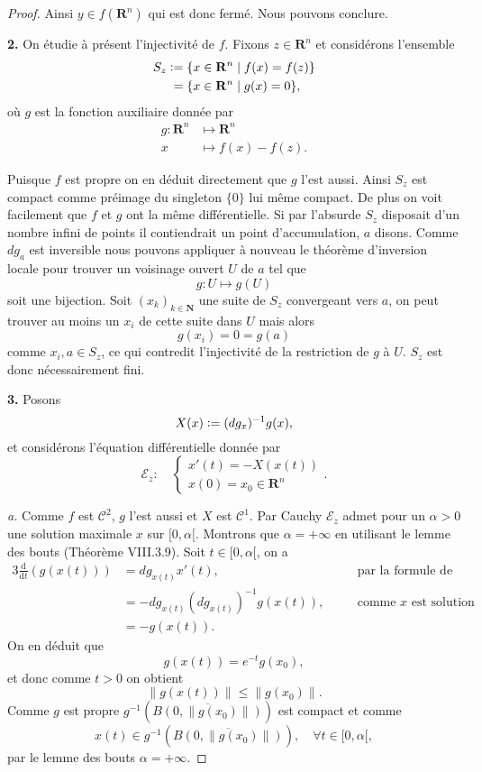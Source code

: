 \documentclass[12pt]{article}
\newcommand{\defeq}{\vcentcolon=}
\newcommand{\R}{\mathbf{R}}
\newcommand{\N}{\mathbf{N}}
\newcommand{\de}{\mathrm{d}}
\begin{document}
\begin{proof}
Ainsi $y \in f(\R^{n})$ qui est donc fermé. Nous pouvons conclure.

\bigskip

\textbf{2.} On étudie à présent l'injectivité de $f$. Fixons $z \in \R^{n}$ et considérons l'ensemble
\begin{align*}
        S_{z} &\defeq \{x \in \R^{n} \;|\; f(x) = f(z)\} \\
              & \; = \{x \in \R^{n} \;|\; g(x) = 0\} 
,\end{align*} où $g$ est la fonction auxiliaire donnée par
 \begin{align*}
         g : \R^{n} &\longmapsto \R^{n} \\
         x &\longmapsto f(x) - f(z)
.\end{align*}

Puisque $f$ est propre on en déduit directement que $g$ l'est aussi. Ainsi $S_{z}$ est compact comme préimage du singleton $\{0\}$ lui même compact.
De plus on voit facilement que $f$ et $g$ ont la même différentielle. Si par l'absurde $S_{z}$ disposait d'un nombre infini de points il contiendrait un point d'accumulation, $a$ disons. Comme $dg_{a}$ est inversible nous pouvons appliquer à nouveau le théorème d'inversion locale pour trouver un voisinage ouvert $U$ de $a$ tel que \[
        g : U \longmapsto g(U)
\] soit une bijection. Soit $(x_{k})_{k\in \N}$ une suite de $S_{z}$ convergeant vers $a$, on peut trouver au moins un $x_{i}$ de cette suite dans $U$ mais alors  \[
g(x_{i}) = 0 = g(a)
\] comme $x_{i}, a \in S_{z}$, ce qui contredit l'injectivité de la restriction de $g$ à $U$. $S_{z}$ est donc nécessairement fini.

\bigskip

\textbf{3.} Posons \[
        X(x) \defeq (dg_{x})^{-1}g(x)
,\] et considérons l'équation différentielle donnée par \[
\mathcal{E}_{z} : \quad \begin{cases}
        x'(t) = -X(x(t)) \\
        x(0) = x_0 \in \R^{n}
\end{cases}
.\] 

\textit{a.} Comme $f$ est $\mathcal{C}^{2}$, $g$ l'est aussi et $X$ est $\mathcal{C}^{1}$. Par Cauchy $\mathcal{E}_{z}$ admet pour un $\alpha > 0$ une solution maximale $x$ sur $[0, \alpha[$. Montrons que $\alpha = +\infty$ en utilisant le lemme des bouts (Théorème VIII.3.9). Soit $t \in [0,\alpha[$, on a
\begin{alignat*}{3}
        \frac{\de}{\de t}(g(x(t))) &= dg_{x(t)}x'(t), && \text{par la formule de dérivation composée}\\
                                   &= -dg_{x(t)}(dg_{x(t)})^{-1}g(x(t)), \quad && \text{comme } x \text{ est solution} \\
                                   &= -g(x(t))
.\end{alignat*}
On en déduit que \[
        g(x(t)) = e^{-t}g(x_0)
,\] et donc comme $t > 0$ on obtient  \[
\|g(x(t))\| \le \|g(x_0)\|
.\] Comme $g$ est propre $g^{-1}(\overline{B(0, \|g(x_0)\|)})$ est compact et comme \[
x(t) \in g^{-1}(\overline{B(0, \|g(x_0)\|)}), \quad \forall t \in [0,\alpha[
,\] par le lemme des bouts $\alpha = +\infty$.


\end{proof}
\end{document}
